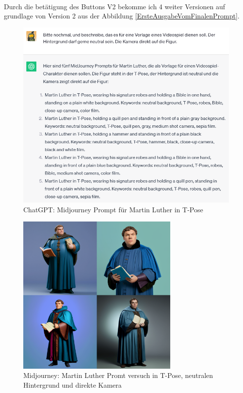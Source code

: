 \\
Durch die betätigung des Buttons V2 bekomme ich 4 weiter Versionen auf grundlage von Version 2 aus der Abbildung \ref{ErsteAusgabeVomFinalenPrompt}.
\begin{figure}[h]
	\centering
	\includegraphics[scale=0.7]{BilderFuerBA/10.png}
	\caption{ChatGPT: Midjourney Prompt für Martin Luther in T-Pose}
	\label{chatgptMartinLutherMJmitNeutralenHintergrund}
\end{figure}
\begin{figure}[h]
	\centering
	\includegraphics[width=8.022cm]{BilderFuerBA/MartinLutherInTPoseFirst.png}
	\caption{Midjourney: Martin Luther Promt versuch in T-Pose, neutralen Hintergrund und direkte Kamera}
	\label{MartinLutherInTPoseNeutralerHintergrundDirekteKamera}
\end{figure}
